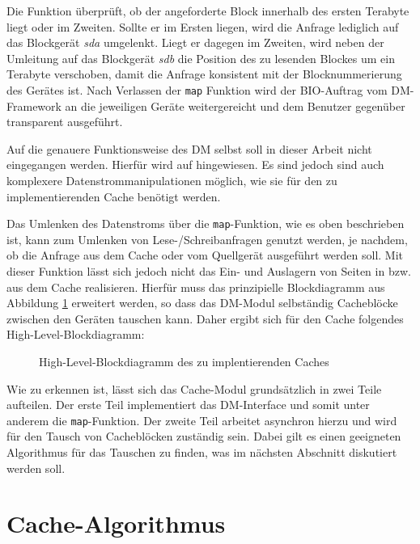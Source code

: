 Die Funktion überprüft, ob der angeforderte Block innerhalb des ersten Terabyte liegt oder im Zweiten. Sollte er im Ersten liegen, wird die Anfrage lediglich
auf das Blockgerät \textit{sda} umgelenkt. Liegt er dagegen im Zweiten, wird neben der Umleitung auf das Blockgerät \textit{sdb} die Position des zu lesenden
Blockes um ein Terabyte verschoben, damit die Anfrage konsistent mit der Blocknummerierung des Gerätes ist. Nach Verlassen der \texttt{map} Funktion wird der
\ac{BIO}-Auftrag vom \ac{DM}-Framework an die jeweiligen Geräte weitergereicht und dem Benutzer gegenüber transparent ausgeführt.

Auf die genauere Funktionsweise des \ac{DM} selbst soll in dieser Arbeit nicht eingegangen werden. Hierfür wird auf \cite{web-dm} hingewiesen. Es sind jedoch
sind auch komplexere Datenstrommanipulationen möglich, wie sie für den zu implementierenden Cache benötigt werden.

Das Umlenken des Datenstroms über die \texttt{map}-Funktion, wie es oben beschrieben ist, kann zum Umlenken von Lese-/Schreibanfragen genutzt werden, je
nachdem, ob die Anfrage aus dem Cache oder vom Quellgerät ausgeführt werden soll. Mit dieser Funktion lässt sich jedoch nicht das Ein- und Auslagern von Seiten in bzw. aus dem
Cache realisieren. Hierfür muss das prinzipielle Blockdiagramm aus Abbildung \ref{img:hlbd} erweitert werden, so dass das \ac{DM}-Modul selbständig Cacheblöcke
zwischen den Geräten tauschen kann. Daher ergibt sich für den Cache folgendes High-Level-Blockdiagramm:

\begin{figure}[H]\centering
    \hspace*{1cm}%
    \caption{High-Level-Blockdiagramm des zu implentierenden Caches}
    \label{img:hlbd}
\end{figure}

Wie zu erkennen ist, lässt sich das Cache-Modul grundsätzlich in zwei Teile aufteilen. Der erste Teil implementiert das \ac{DM}-Interface und somit unter anderem
die \texttt{map}-Funktion. Der zweite Teil arbeitet asynchron hierzu und wird für den Tausch von Cacheblöcken zuständig sein. Dabei gilt es einen geeigneten
Algorithmus für das Tauschen zu finden, was im nächsten Abschnitt diskutiert werden soll.

\section{Cache-Algorithmus}
\label{chap5:algo}

